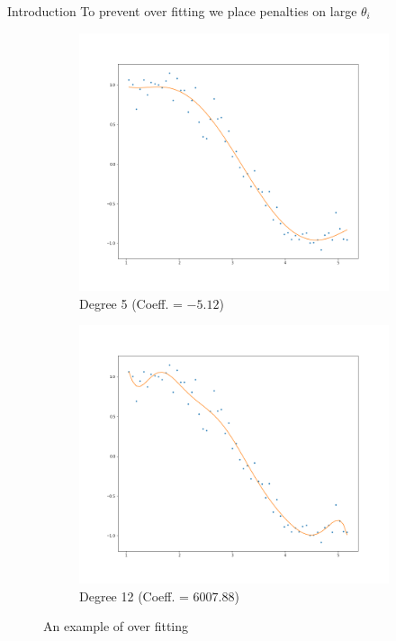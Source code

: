 \documentclass{beamer}
\begin{document}
\begin{frame}{Introduction}
\vspace{0.9cm}
To prevent over fitting we place penalties on large $\theta_i$
\vspace{-0.4cm}
\begin{figure}
        \begin{subfigure}[b]{0.5\textwidth}
                \includegraphics[width=\linewidth]{ridge/lin_plot_5.png}
                \caption{Degree 5 (Coeff. = $-5.12$)}
        \end{subfigure}%
        \begin{subfigure}[b]{0.5\textwidth}
                \includegraphics[width=\linewidth]{ridge/lin_plot_12.png}
                \caption{Degree 12 (Coeff. = $6007.88$)}
        \end{subfigure}%
        \caption{An example of over fitting}
\end{figure}
\end{frame}  
  
\end{document}
